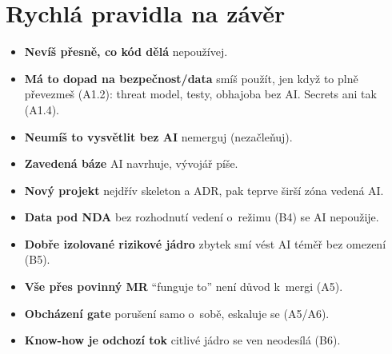 \section{Rychlá pravidla na závěr}

\begin{itemize}
\item \textbf{Nevíš přesně, co kód dělá} \then{} nepoužívej.
\item \textbf{Má to dopad na bezpečnost/data} \then{} smíš použít, jen když to plně převezmeš (A1.2): threat model, testy, obhajoba bez AI. Secrets ani tak (A1.4).
\item \textbf{Neumíš to vysvětlit bez AI} \then{} nemerguj (nezačleňuj).
\item \textbf{Zavedená báze} \then{} AI navrhuje, vývojář píše.
\item \textbf{Nový projekt} \then{} nejdřív skeleton a ADR, pak teprve širší zóna vedená AI.
\item \textbf{Data pod NDA} \then{} bez rozhodnutí vedení o~režimu (B4) se AI nepoužije.
\item \textbf{Dobře izolované rizikové jádro} \then{} zbytek smí vést AI téměř bez omezení (B5).
\item \textbf{Vše přes povinný MR} \then{} \enquote{funguje to} není důvod k~mergi (A5).
\item \textbf{Obcházení gate} \then{} porušení samo o~sobě, eskaluje se (A5/A6).
\item \textbf{Know-how je odchozí tok} \then{} citlivé jádro se ven neodesílá (B6).
\end{itemize}


